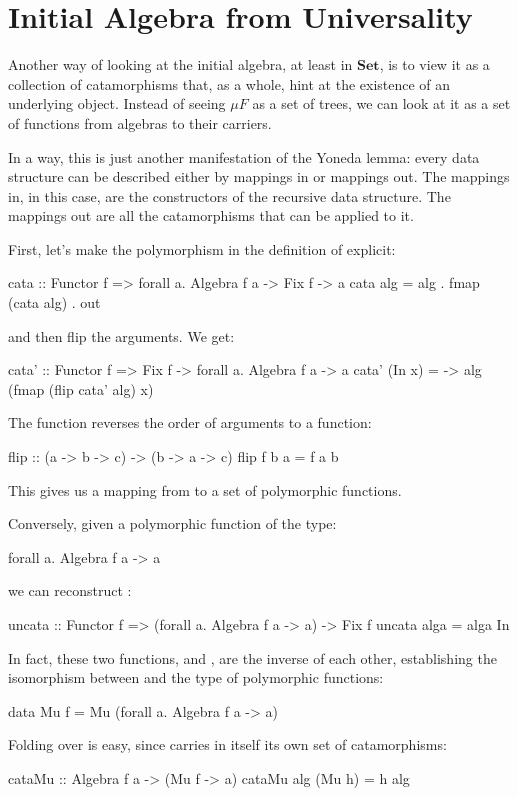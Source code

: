 \documentclass[DaoFP]{subfiles}
\begin{document}
\section{Initial Algebra from Universality}

Another way of looking at the initial algebra, at least in $\mathbf{Set}$, is to view it as a collection of catamorphisms that, as a whole, hint at the existence of an underlying object. Instead of seeing $\mu F$ as a set of trees, we can look at it as a set of functions from algebras to their carriers. 

In a way, this is just another manifestation of the Yoneda lemma: every data structure can be described either by mappings in or mappings out. The mappings in, in this case, are the constructors of the recursive data structure. The mappings out are all the catamorphisms that can be applied to it.

First, let's make the polymorphism in the definition of  explicit:
\begin{haskell}
cata :: Functor f => forall a. Algebra f a -> Fix f -> a
cata alg = alg . fmap (cata alg) . out
\end{haskell}
and then flip the arguments. We get:
\begin{haskell}
cata' :: Functor f => Fix f -> forall a. Algebra f a -> a
cata' (In x) = \alg -> alg (fmap (flip cata' alg) x)
\end{haskell}
The function  reverses the order of arguments to a function:
\begin{haskell}
flip :: (a -> b -> c) -> (b -> a -> c)
flip f b a = f a b
\end{haskell}
This gives us a mapping from  to a set of polymorphic functions.

Conversely, given a polymorphic function of the type:
\begin{haskell}
forall a. Algebra f a -> a
\end{haskell}
we can reconstruct :
\begin{haskell}
uncata :: Functor f => (forall a. Algebra f a -> a) -> Fix f
uncata alga = alga In
\end{haskell}
In fact, these two functions,  and , are the inverse of each other, establishing the isomorphism between  and the type of polymorphic functions:
\begin{haskell}
data Mu f = Mu (forall a. Algebra f a -> a)
\end{haskell}
Folding over  is easy, since  carries in itself its own set of catamorphisms:
\begin{haskell}
cataMu :: Algebra f a -> (Mu f -> a)
cataMu alg (Mu h) = h alg
\end{haskell}
\end{document}
